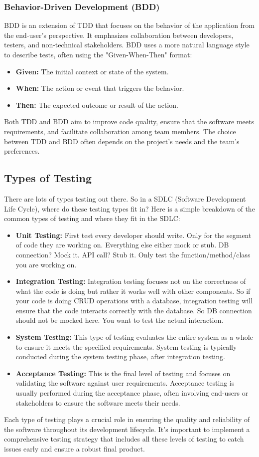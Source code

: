\subsubsection{Behavior-Driven Development (BDD)}
BDD is an extension of TDD that focuses on the behavior of the application from the end-user's perspective. It emphasizes collaboration between developers, testers, and non-technical stakeholders. BDD uses a more natural language style to describe tests, often using the "Given-When-Then" format:
\begin{itemize}
    \item \textbf{Given:} The initial context or state of the system.
    \item \textbf{When:} The action or event that triggers the behavior.
    \item \textbf{Then:} The expected outcome or result of the action.
\end{itemize}
Both TDD and BDD aim to improve code quality, ensure that the software meets requirements, and facilitate collaboration among team members. The choice between TDD and BDD often depends on the project's needs and the team's preferences.

\subsection{Types of Testing}
There are lots of types testing out there. So in a SDLC (Software Development Life Cycle), where do these testing types fit in? Here is a simple breakdown of the common types of testing and where they fit in the SDLC:
\begin{itemize}
    \item \textbf{Unit Testing:} First test every developer should write. Only for the segment of code they are working on. Everything else either mock or stub. DB connection? Mock it. API call? Stub it. Only test the function/method/class you are working on.
    \item \textbf{Integration Testing:} Integration testing focuses not on the correctness of what the code is doing but rather it works well with other components. So if your code is doing CRUD operations with a database, integration testing will ensure that the code interacts correctly with the database. So DB connection should not be mocked here. You want to test the actual interaction.
    \item \textbf{System Testing:} This type of testing evaluates the entire system as a whole to ensure it meets the specified requirements. System testing is typically conducted during the system testing phase, after integration testing.
    \item \textbf{Acceptance Testing:} This is the final level of testing and focuses on validating the software against user requirements. Acceptance testing is usually performed during the acceptance phase, often involving end-users or stakeholders to ensure the software meets their needs.
\end{itemize}
Each type of testing plays a crucial role in ensuring the quality and reliability of the software throughout its development lifecycle. It's important to implement a comprehensive testing strategy that includes all these levels of testing to catch issues early and ensure a robust final product.